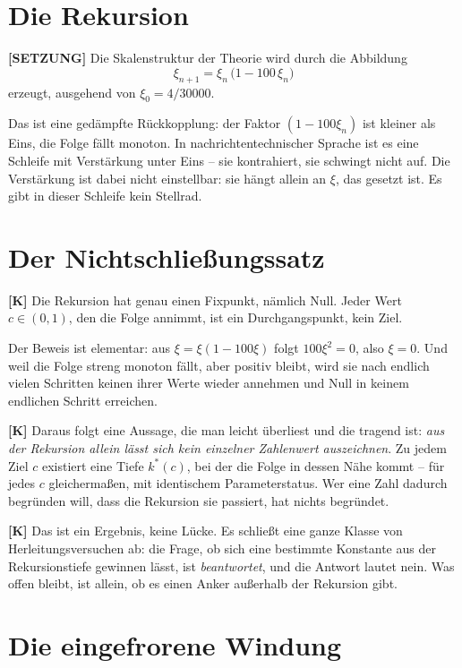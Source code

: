 \section{Die Rekursion}

\textbf{[SETZUNG]} Die Skalenstruktur der Theorie wird durch die Abbildung
\[
  \xi_{n+1} = \xi_n\,\bigl(1 - 100\,\xi_n\bigr)
\]
erzeugt, ausgehend von $\xi_0 = 4/30000$.

Das ist eine gedämpfte Rückkopplung: der Faktor $(1-100\xi_n)$ ist kleiner als
Eins, die Folge fällt monoton. In nachrichtentechnischer Sprache ist es eine
Schleife mit Verstärkung unter Eins -- sie kontrahiert, sie schwingt nicht auf.
Die Verstärkung ist dabei nicht einstellbar: sie hängt allein an $\xi$, das
gesetzt ist. Es gibt in dieser Schleife kein Stellrad.

\section{Der Nichtschließungssatz}

\textbf{[K]} Die Rekursion hat genau einen Fixpunkt, nämlich Null. Jeder Wert
$c \in (0,1)$, den die Folge annimmt, ist ein Durchgangspunkt, kein Ziel.

Der Beweis ist elementar: aus $\xi = \xi(1-100\xi)$ folgt $100\xi^2 = 0$, also
$\xi = 0$. Und weil die Folge streng monoton fällt, aber positiv bleibt, wird
sie nach endlich vielen Schritten keinen ihrer Werte wieder annehmen und Null
in keinem endlichen Schritt erreichen.

\textbf{[K]} Daraus folgt eine Aussage, die man leicht überliest und die
tragend ist: \emph{aus der Rekursion allein lässt sich kein einzelner
Zahlenwert auszeichnen}. Zu jedem Ziel $c$ existiert eine Tiefe $k^*(c)$, bei
der die Folge in dessen Nähe kommt -- für jedes $c$ gleichermaßen, mit
identischem Parameterstatus. Wer eine Zahl dadurch begründen will, dass die
Rekursion sie passiert, hat nichts begründet.

\textbf{[K]} Das ist ein Ergebnis, keine Lücke. Es schließt eine ganze Klasse
von Herleitungsversuchen ab: die Frage, ob sich eine bestimmte Konstante aus
der Rekursionstiefe gewinnen lässt, ist \emph{beantwortet}, und die Antwort
lautet nein. Was offen bleibt, ist allein, ob es einen Anker außerhalb der
Rekursion gibt.

\section{Die eingefrorene Windung}

